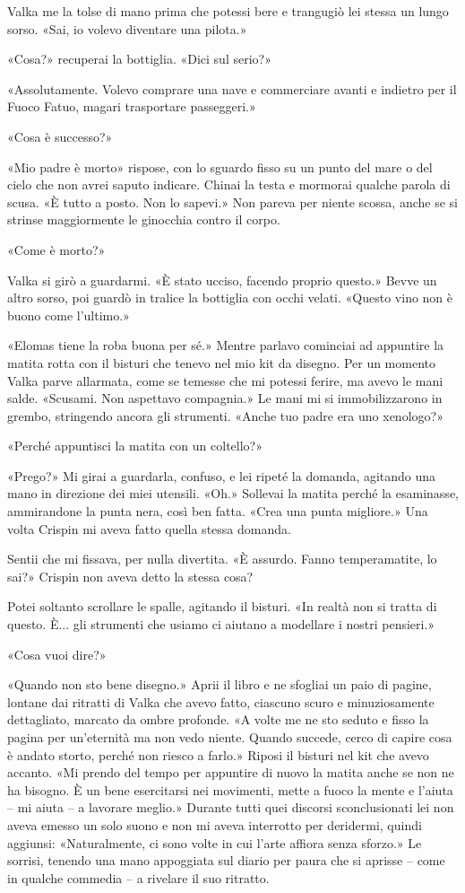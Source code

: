 Valka me la tolse di mano prima che potessi bere e trangugiò lei stessa
un lungo sorso. «Sai, io volevo diventare una pilota.»

«Cosa?» recuperai la bottiglia. «Dici sul serio?»

«Assolutamente. Volevo comprare una nave e commerciare avanti e indietro
per il Fuoco Fatuo, magari trasportare passeggeri.»

«Cosa è successo?»

«Mio padre è morto» rispose, con lo sguardo fisso su un punto del mare o
del cielo che non avrei saputo indicare. Chinai la testa e mormorai
qualche parola di scusa. «È tutto a posto. Non lo sapevi.» Non pareva
per niente scossa, anche se si strinse maggiormente le ginocchia contro
il corpo.

«Come è morto?»

Valka si girò a guardarmi. «È stato ucciso, facendo proprio questo.»
Bevve un altro sorso, poi guardò in tralice la bottiglia con occhi
velati. «Questo vino non è buono come l'ultimo.»

«Elomas tiene la roba buona per sé.» Mentre parlavo cominciai ad
appuntire la matita rotta con il bisturi che tenevo nel mio kit da
disegno. Per un momento Valka parve allarmata, come se temesse che mi
potessi ferire, ma avevo le mani salde. «Scusami. Non aspettavo
compagnia.» Le mani mi si immobilizzarono in grembo, stringendo ancora
gli strumenti. «Anche tuo padre era uno xenologo?»

«Perché appuntisci la matita con un coltello?»

«Prego?» Mi girai a guardarla, confuso, e lei ripeté la domanda,
agitando una mano in direzione dei miei utensili. «Oh.» Sollevai la
matita perché la esaminasse, ammirandone la punta nera, così ben fatta.
«Crea una punta migliore.» Una volta Crispin mi aveva fatto quella
stessa domanda.

Sentii che mi fissava, per nulla divertita. «È assurdo. Fanno
temperamatite, lo sai?» Crispin non aveva detto la stessa cosa?

Potei soltanto scrollare le spalle, agitando il bisturi. «In realtà non
si tratta di questo. È... gli strumenti che usiamo ci aiutano a
modellare i nostri pensieri.»

«Cosa vuoi dire?»

«Quando non sto bene disegno.» Aprii il libro e ne sfogliai un paio di
pagine, lontane dai ritratti di Valka che avevo fatto, ciascuno scuro e
minuziosamente dettagliato, marcato da ombre profonde. «A volte me ne
sto seduto e fisso la pagina per un'eternità ma non vedo niente. Quando
succede, cerco di capire cosa è andato storto, perché non riesco a
farlo.» Riposi il bisturi nel kit che avevo accanto. «Mi prendo del
tempo per appuntire di nuovo la matita anche se non ne ha bisogno. È un
bene esercitarsi nei movimenti, mette a fuoco la mente e l'aiuta -- mi
aiuta -- a lavorare meglio.» Durante tutti quei discorsi sconclusionati
lei non aveva emesso un solo suono e non mi aveva interrotto per
deridermi, quindi aggiunsi: «Naturalmente, ci sono volte in cui l'arte
affiora senza sforzo.» Le sorrisi, tenendo una mano appoggiata sul
diario per paura che si aprisse -- come in qualche commedia -- a
rivelare il suo ritratto.

